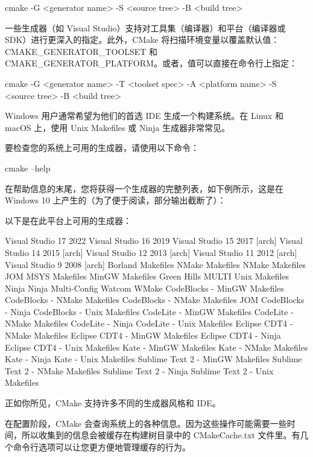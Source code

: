 \begin{shell}
cmake -G <generator name> -S <source tree> -B <build tree>
\end{shell}

一些生成器（如 Visual Studio）支持对工具集（编译器）和平台（编译器或 SDK）进行更深入的指定。此外，CMake 将扫描环境变量以覆盖默认值：CMAKE\_GENERATOR\_TOOLSET 和 CMAKE\_GENERATOR\_PLATFORM。或者，值可以直接在命令行上指定：

\begin{shell}
cmake -G <generator name>
      -T <toolset spec>
      -A <platform name>
      -S <source tree> -B <build tree>
\end{shell}

Windows 用户通常希望为他们的首选 IDE 生成一个构建系统。在 Linux 和 macOS 上，使用 Unix Makefiles 或 Ninja 生成器非常常见。

要检查您的系统上可用的生成器，请使用以下命令：

\begin{shell}
cmake --help
\end{shell}

在帮助信息的末尾，您将获得一个生成器的完整列表，如下例所示，这是在 Windows 10 上产生的（为了便于阅读，部分输出截断了）：

以下是在此平台上可用的生成器：

\begin{shell}
Visual Studio 17 2022
Visual Studio 16 2019
Visual Studio 15 2017 [arch]
Visual Studio 14 2015 [arch]
Visual Studio 12 2013 [arch]
Visual Studio 11 2012 [arch]
Visual Studio 9 2008 [arch]
Borland Makefiles
NMake Makefiles
NMake Makefiles JOM
MSYS Makefiles
MinGW Makefiles
Green Hills MULTI
Unix Makefiles
Ninja
Ninja Multi-Config
Watcom WMake
CodeBlocks - MinGW Makefiles
CodeBlocks - NMake Makefiles
CodeBlocks - NMake Makefiles JOM
CodeBlocks - Ninja
CodeBlocks - Unix Makefiles
CodeLite - MinGW Makefiles
CodeLite - NMake Makefiles
CodeLite - Ninja
CodeLite - Unix Makefiles
Eclipse CDT4 - NMake Makefiles
Eclipse CDT4 - MinGW Makefiles
Eclipse CDT4 - Ninja
Eclipse CDT4 - Unix Makefiles
Kate - MinGW Makefiles
Kate - NMake Makefiles
Kate - Ninja
Kate - Unix Makefiles
Sublime Text 2 - MinGW Makefiles
Sublime Text 2 - NMake Makefiles
Sublime Text 2 - Ninja
Sublime Text 2 - Unix Makefiles
\end{shell}

正如你所见，CMake 支持许多不同的生成器风格和 IDE。


在配置阶段，CMake 会查询系统上的各种信息。因为这些操作可能需要一些时间，所以收集到的信息会被缓存在构建树目录中的 CMakeCache.txt 文件里。有几个命令行选项可以让您更方便地管理缓存的行为。

